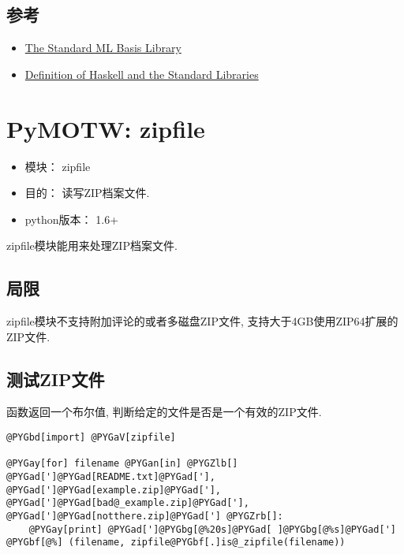 \documentclass[a4paper,10pt,english]{manual}
\begin{document}
\section{参考}
\begin{itemize}
\item {} 
\href{http://www.standardml.org/Basis/}{The Standard ML Basis Library}

\item {} 
\href{http://www.haskell.org/definition/}{Definition of Haskell and the Standard Libraries}

\end{itemize}

\resetcurrentobjects


\chapter{PyMOTW: zipfile}
\begin{itemize}
\item {} 
模块： zipfile

\item {} 
目的： 读写ZIP档案文件.

\item {} 
python版本： 1.6+

\end{itemize}

zipfile模块能用来处理ZIP档案文件.


\section{局限}

zipfile模块不支持附加评论的或者多磁盘ZIP文件, 支持大于4GB使用ZIP64扩展的ZIP文件.


\section{测试ZIP文件}

 函数返回一个布尔值, 判断给定的文件是否是一个有效的ZIP文件.

\begin{Verbatim}[commandchars=@\[\]]
@PYGbd[import] @PYGaV[zipfile]

@PYGay[for] filename @PYGan[in] @PYGZlb[] @PYGad[']@PYGad[README.txt]@PYGad['], @PYGad[']@PYGad[example.zip]@PYGad['], @PYGad[']@PYGad[bad@_example.zip]@PYGad['], @PYGad[']@PYGad[notthere.zip]@PYGad['] @PYGZrb[]:
    @PYGay[print] @PYGad[']@PYGbg[@%20s]@PYGad[ ]@PYGbg[@%s]@PYGad['] @PYGbf[@%] (filename, zipfile@PYGbf[.]is@_zipfile(filename))
\end{Verbatim}
\end{document}
